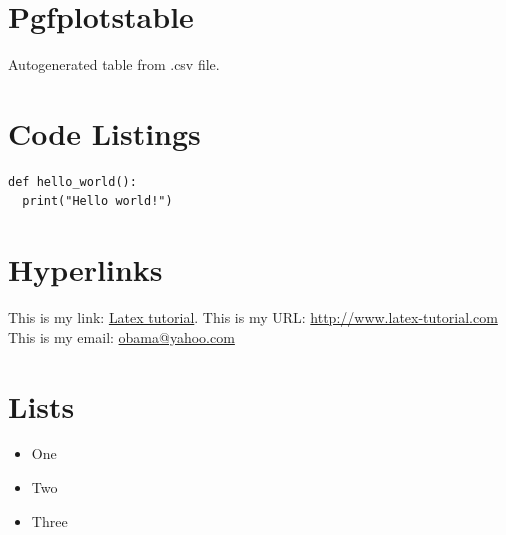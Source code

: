 \documentclass{article}
\begin{document}
\section{Pgfplotstable}
\begin{table}[!ht]
\begin{center}
    

\caption{Autogenerated table from .csv file.}
\label{table3}
\end{center}
\end{table}

\section{Code Listings}
\begin{lstlisting}
def hello_world():
  print("Hello world!")
\end{lstlisting}

\section{Hyperlinks}
This is my link: \href{http://www.latex-tutorial.com}{Latex tutorial}.
This is my URL: \url{http://www.latex-tutorial.com}
This is my email: \href{mailto:obama@yahoo.com}{obama@yahoo.com}

\section{Lists}
\begin{itemize}
\item One
\item Two
\item Three
\end{itemize}
\end{document}
